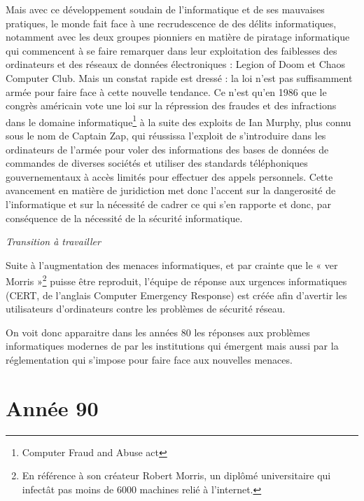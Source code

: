 \documentclass[a4paper]{memoir}
\begin{document}
Mais avec ce développement soudain de l'informatique et de ses mauvaises pratiques, le monde fait face à une recrudescence de des délits informatiques, notamment avec les deux groupes pionniers en matière de piratage informatique qui commencent à se faire remarquer dans leur exploitation des faiblesses des ordinateurs et des réseaux de données électroniques : Legion of Doom et Chaos Computer Club. Mais un constat rapide est dressé : la loi n'est pas suffisamment armée pour faire face à cette nouvelle tendance. Ce n'est qu'en 1986 que le congrès américain vote une loi sur la répression des fraudes et des infractions dans le domaine informatique\footnote{Computer Fraud and Abuse act} à la suite des exploits de Ian Murphy, plus connu sous le nom de Captain Zap, qui réussissa l'exploit de s'introduire dans les ordinateurs de l'armée pour voler des informations des bases de données de commandes de diverses sociétés et utiliser des standards téléphoniques gouvernementaux à accès limités pour effectuer des appels personnels. 
Cette avancement en matière de juridiction met donc l'accent sur la dangerosité de l'informatique et sur la nécessité de cadrer ce qui s'en rapporte et donc, par conséquence de la nécessité de la sécurité informatique.

\textit{Transition à travailler}

Suite à l'augmentation des menaces informatiques, et par crainte que le « ver Morris »\footnote{En référence à son créateur Robert Morris, un diplômé universitaire qui infectât pas moins de 6000 machines relié à l'internet.} puisse être reproduit, l'équipe de réponse aux urgences informatiques (CERT, de l'anglais Computer Emergency Response) est créée afin d'avertir les utilisateurs d'ordinateurs contre les problèmes de sécurité réseau.

On voit donc apparaitre dans les années 80 les réponses aux problèmes informatiques modernes de par les institutions qui émergent mais aussi par la réglementation qui s'impose pour faire face aux nouvelles menaces.

\section{Année 90}
\end{document}
